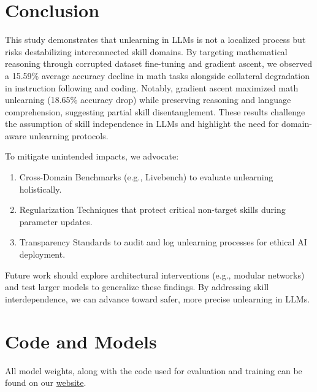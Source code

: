 \documentclass[10.5pt]{article}
\begin{document}
\section{Conclusion}
This study demonstrates that unlearning in LLMs is not a localized process but risks destabilizing interconnected skill domains. By targeting mathematical reasoning through corrupted dataset fine-tuning and gradient ascent, we observed a 15.59\% average accuracy decline in math tasks alongside collateral degradation in instruction following and coding. Notably, gradient ascent maximized math unlearning (18.65\% accuracy drop) while preserving reasoning and language comprehension, suggesting partial skill disentanglement. These results challenge the assumption of skill independence in LLMs and highlight the need for domain-aware unlearning protocols.

To mitigate unintended impacts, we advocate:
\begin{enumerate}
    \item Cross-Domain Benchmarks (e.g., Livebench) to evaluate unlearning holistically.
    \item Regularization Techniques that protect critical non-target skills during parameter updates.
    \item Transparency Standards to audit and log unlearning processes for ethical AI deployment.
\end{enumerate}
Future work should explore architectural interventions (e.g., modular networks) and test larger models to generalize these findings. By addressing skill interdependence, we can advance toward safer, more precise unlearning in LLMs.

\section{Code and Models}
All model weights, along with the code used for evaluation and training can be found on our \href{https://johnphan19.github.io/csci5541-final-project/}{website}.


\end{document}
